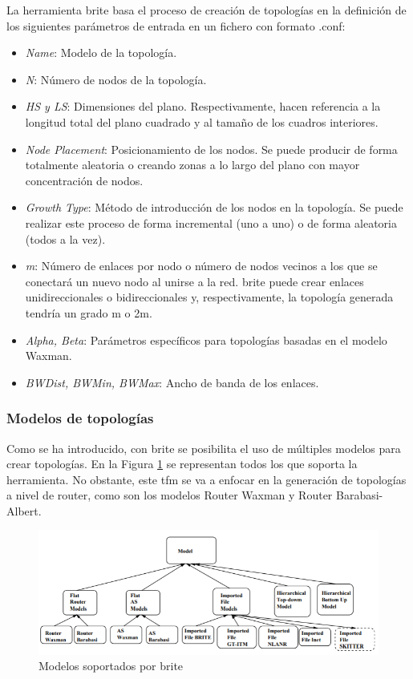 La herramienta \gls{brite} basa el proceso de creación de topologías en la definición de los siguientes parámetros de entrada en un fichero con formato .conf:

\begin{itemize}
    \item \textit{Name}: Modelo de la topología.
    \item \textit{N}: Número de nodos de la topología.  
    \item \textit{HS y LS}: Dimensiones del plano. Respectivamente, hacen referencia a la longitud total del plano cuadrado y al tamaño de los cuadros interiores.
    \item \textit{Node Placement}: Posicionamiento de los nodos. Se puede producir de forma totalmente aleatoria o creando zonas a lo largo del plano con mayor concentración de nodos. 
    \item \textit{Growth Type}: Método de introducción de los nodos en la topología. Se puede realizar este proceso de forma incremental (uno a uno) o de forma aleatoria (todos a la vez). 
    \item \textit{m}: Número de enlaces por nodo o número de nodos vecinos a los que se conectará un nuevo nodo al unirse a la red. \gls{brite} puede crear enlaces unidireccionales o bidireccionales y, respectivamente, la topología generada tendría un grado m o 2m.
    \item \textit{Alpha, Beta}: Parámetros específicos para topologías basadas en el modelo Waxman.
    \item \textit{BWDist, BWMin, BWMax}: Ancho de banda de los enlaces.
\end{itemize}

\vspace{1mm}

\subsubsection{Modelos de topologías}

Como se ha introducido, con \gls{brite} se posibilita el uso de múltiples modelos para crear topologías. En la Figura \ref{fig:brite} se representan todos los que soporta la herramienta. No obstante, este \gls{tfm} se va a enfocar en la generación de topologías a nivel de router, como son los modelos Router Waxman y Router Barabasi-Albert. 

\vspace{3mm}

\begin{figure}[h!]
    \centering
    \includegraphics[width=1\textwidth]{img/teoria/brite.PNG}
    \caption{Modelos soportados por \acrshort{brite} \cite{brite}}
    \label{fig:brite}
\end{figure}

